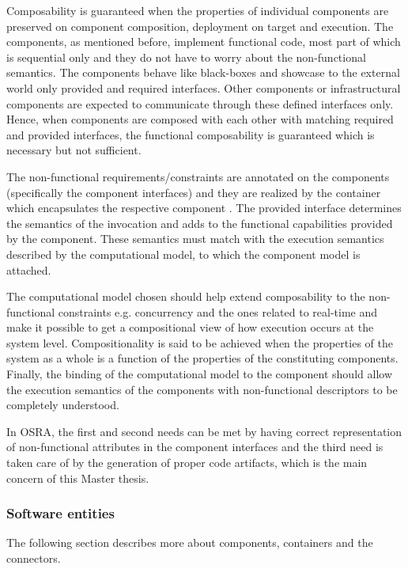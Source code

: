 \begin{description}
Composability is guaranteed when the properties of individual components are preserved on component composition, deployment on target and execution. The components, as mentioned before, implement functional code, most part of which is sequential only and they do not have to worry about the non-functional semantics. The components behave like black-boxes and showcase to the external world only provided and required interfaces. Other components or infrastructural components are expected to communicate through these defined interfaces only. Hence, when components are composed with each other with matching required and provided interfaces, the functional composability is guaranteed which is necessary but not sufficient.

The non-functional requirements/constraints are annotated on the components (specifically the component interfaces) and they are realized by the container which encapsulates the respective component \cite{SAVOIR}\cite{ComponentModel}. The provided interface determines the semantics of the invocation and adds to the functional capabilities provided by the component. These semantics must match with the execution semantics described by the computational model, to which the component model is attached.

The computational model chosen should help extend composability to the non-functional constraints e.g. concurrency and the ones related to real-time and make it possible to get a compositional view of how execution occurs at the system level. Compositionality is said to be achieved when the properties of the system as a whole is a function of the properties of the constituting components. Finally, the binding of the computational model to the component should allow the execution semantics of the components with non-functional descriptors to be completely understood.

In OSRA, the first and second needs can be met by having correct representation of non-functional attributes in the component interfaces and the third need is taken care of by the generation of proper code artifacts, which is the main concern of this Master thesis.     
\end{description}

\subsubsection{Software entities}
\label {section: Software entities}
The following section describes more about components, containers and the connectors.

